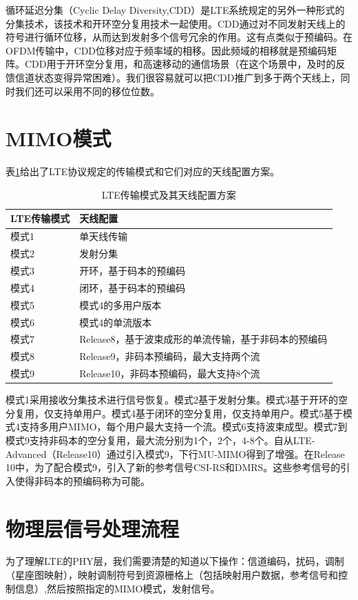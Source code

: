 \documentclass[10pt,a4paper,UTF8]{article}
\begin{document}
循环延迟分集（Cyclic Delay Diversity,CDD）是LTE系统规定的另外一种形式的分集技术，该技术和开环空分复用技术一起使用。CDD通过对不同发射天线上的符号进行循环位移，从而达到发射多个信号冗余的作用。这有点类似于预编码。在OFDM传输中，CDD位移对应于频率域的相移。因此频域的相移就是预编码矩阵。CDD用于开环空分复用，和高速移动的通信场景（在这个场景中，及时的反馈信道状态变得异常困难）。我们很容易就可以把CDD推广到多于两个天线上，同时我们还可以采用不同的移位位数。
\section{MIMO模式}
\label{sec:orgheadline33}


表\ref{tab:orgtable5}给出了LTE协议规定的传输模式和它们对应的天线配置方案。
\begin{table}[htb]
\caption{\label{tab:orgtable5}
LTE传输模式及其天线配置方案}
\centering
\begin{tabular}{ll}
\hline
LTE传输模式 & 天线配置\\
\hline
模式1 & 单天线传输\\
模式2 & 发射分集\\
模式3 & 开环，基于码本的预编码\\
模式4 & 闭环，基于码本的预编码\\
模式5 & 模式4的多用户版本\\
模式6 & 模式4的单流版本\\
模式7 & Release8，基于波束成形的单流传输，基于非码本的预编码\\
模式8 & Release9，非码本预编码，最大支持两个流\\
模式9 & Release10，非码本预编码，最大支持8个流\\
\hline
\end{tabular}
\end{table}

模式1采用接收分集技术进行信号恢复。模式2基于发射分集。模式3基于开环的空分复用，仅支持单用户。模式4基于闭环的空分复用，仅支持单用户。模式5基于模式4支持多用户MIMO，每个用户最大支持一个流。模式6支持波束成型。模式7到模式9支持非码本的空分复用，最大流分别为1个，2个，4-8个。自从LTE-Advanced（Release10）通过引入模式9，下行MU-MIMO得到了增强。在Release 10中，为了配合模式9，引入了新的参考信号CSI-RS和DMRS。这些参考信号的引入使得非码本的预编码称为可能。
\section{物理层信号处理流程}
\label{sec:orgheadline35}


为了理解LTE的PHY层，我们需要清楚的知道以下操作：信道编码，扰码，调制（星座图映射），映射调制符号到资源栅格上（包括映射用户数据，参考信号和控制信息）,然后按照指定的MIMO模式，发射信号。
\end{document}
